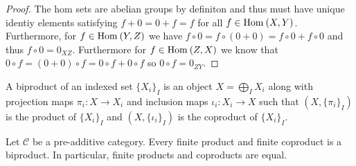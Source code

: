 \documentclass[12pt]{article}
\begin{document}
\begin{proof}
The hom sets are abelian groups by definiton and thus must have unique identiy elements satisfying $f + 0 = 0 + f = f$ for all $f \in \mathrm{Hom}_{} \left( X, Y \right)$. Furthermore, for $f \in \mathrm{Hom}_{} \left( Y, Z \right)$ we have $f \circ 0 = f \circ (0 + 0) = f \circ 0 + f \circ 0$ and thus $f \circ 0 = 0_{XZ}$. Furthermore for $f \in \mathrm{Hom}_{} \left( Z, X \right)$ we know that $0 \circ f = (0 + 0) \circ f = 0 \circ f + 0 \circ f$ so $0 \circ f = 0_{ZY}$.  
\end{proof}

\begin{definition}
A biproduct of an indexed set $\{X_i\}_I$ is an object $X = \bigoplus_I X_i$ along with projection maps $\pi_i : X \to X_i$ and inclusion maps $\iota_i : X_i \to X$ such that $(X, \{ \pi_i \}_I)$ is the product of $\{X_i\}_I$ and $(X, \{ \iota_i \}_I )$ is the coproduct of $\{ X_i \}_I$.  
\end{definition}



\begin{proposition}
Let $\mathcal{C}$ be a pre-additive category. Every finite product and finite coproduct is a biproduct. In particular, finite products and coproducts are equal. 
\end{proposition}
\end{document}
